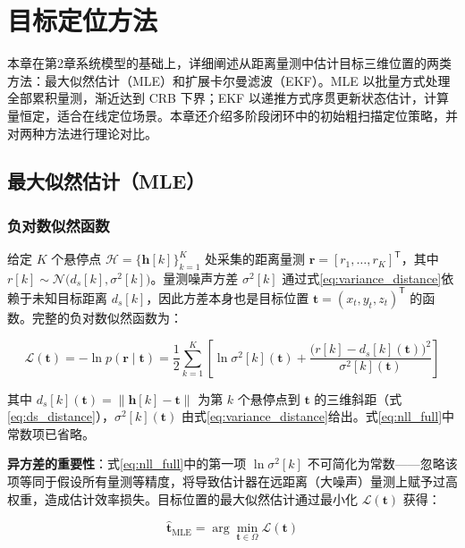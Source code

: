 \chapter{目标定位方法}

本章在第2章系统模型的基础上，详细阐述从距离量测中估计目标三维位置的两类方法：最大似然估计（MLE）和扩展卡尔曼滤波（EKF）。MLE 以批量方式处理全部累积量测，渐近达到 CRB 下界；EKF 以递推方式序贯更新状态估计，计算量恒定，适合在线定位场景。本章还介绍多阶段闭环中的初始粗扫描定位策略，并对两种方法进行理论对比。

\section{最大似然估计（MLE）}
\label{sec:mle}

\subsection{负对数似然函数}

给定 $K$ 个悬停点 $\mathcal{H}=\{\mathbf{h}[k]\}_{k=1}^{K}$ 处采集的距离量测 $\mathbf{r}=[r_1,\ldots,r_K]^{\mathsf{T}}$，其中 $r[k]\sim\mathcal{N}\bigl(d_s[k],\sigma^2[k]\bigr)$。量测噪声方差 $\sigma^2[k]$ 通过式\eqref{eq:variance_distance}依赖于未知目标距离 $d_s[k]$，因此方差本身也是目标位置 $\mathbf{t}=(x_t,y_t,z_t)^{\mathsf{T}}$ 的函数。完整的负对数似然函数为：

\begin{equation}
\mathcal{L}(\mathbf{t})=-\ln p(\mathbf{r}\mid\mathbf{t})
=\frac{1}{2}\sum_{k=1}^{K}\left[\ln\sigma^2[k](\mathbf{t})+
\frac{\bigl(r[k]-d_s[k](\mathbf{t})\bigr)^2}{\sigma^2[k](\mathbf{t})}\right]
\label{eq:nll_full}
\end{equation}

其中 $d_s[k](\mathbf{t})=\|\mathbf{h}[k]-\mathbf{t}\|$ 为第 $k$ 个悬停点到 $\mathbf{t}$ 的三维斜距（式\eqref{eq:ds_distance}），$\sigma^2[k](\mathbf{t})$ 由式\eqref{eq:variance_distance}给出。式\eqref{eq:nll_full}中常数项已省略。

\textbf{异方差的重要性}：式\eqref{eq:nll_full}中的第一项 $\ln\sigma^2[k]$ 不可简化为常数——忽略该项等同于假设所有量测等精度，将导致估计器在远距离（大噪声）量测上赋予过高权重，造成估计效率损失。目标位置的最大似然估计通过最小化 $\mathcal{L}(\mathbf{t})$ 获得：

\begin{equation}
\hat{\mathbf{t}}_{\mathrm{MLE}}=\arg\min_{\mathbf{t}\in\Omega}\mathcal{L}(\mathbf{t})
\label{eq:mle_optimization}
\end{equation}

